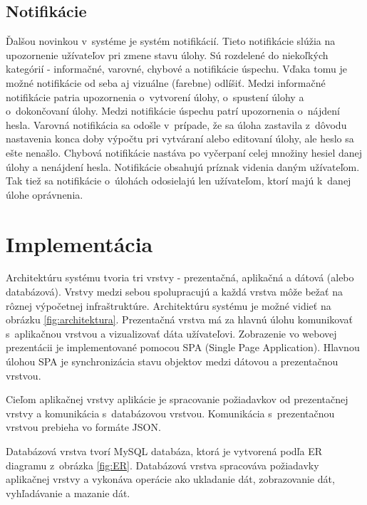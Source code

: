 \documentclass[slovak]{fitthesis}
\begin{document}
\section{Notifikácie}
Ďalšou novinkou v~systéme je systém notifikácií. Tieto notifikácie slúžia na upozornenie užívateľov pri zmene stavu úlohy. Sú rozdelené do niekoľkých kategórií - informačné, varovné, chybové a notifikácie úspechu. Vďaka tomu je možné notifikácie od seba aj vizuálne (farebne) odlíšiť. Medzi informačné notifikácie patria upozornenia o~vytvorení úlohy, o~spustení úlohy a o~dokončovaní úlohy. Medzi notifikácie úspechu patrí upozornenia o~nájdení hesla. Varovná notifikácia sa odošle v~prípade, že sa úloha zastavila z~dôvodu nastavenia konca doby výpočtu pri vytváraní alebo editovaní úlohy, ale heslo sa ešte nenašlo. Chybová notifikácie nastáva po vyčerpaní celej množiny hesiel danej úlohy a nenájdení hesla. Notifikácie obsahujú príznak videnia daným užívateľom. Tak tiež sa notifikácie o~úlohách odosielajú len užívateľom, ktorí majú k~danej úlohe oprávnenia.





\chapter{Implementácia}\label{implementacia}
Architektúru systému tvoria tri vrstvy - prezentačná, aplikačná a dátová (alebo databázová). Vrstvy medzi sebou spolupracujú a každá vrstva môže bežať na rôznej výpočetnej infraštruktúre. Architektúru systému je možné vidieť na obrázku \ref{fig:architektura}.
Prezentačná vrstva má za hlavnú úlohu komunikovať s~aplikačnou vrstvou a vizualizovať dáta užívateľovi. Zobrazenie vo webovej prezentácii je implementované pomocou SPA (Single Page Application). Hlavnou úlohou SPA je synchronizácia stavu objektov medzi dátovou a prezentačnou vrstvou. 

Cieľom aplikačnej vrstvy aplikácie je spracovanie požiadavkov od prezentačnej vrstvy a komunikácia s~databázovou vrstvou. Komunikácia s~prezentačnou vrstvou prebieha vo formáte JSON.

Databázová vrstva tvorí MySQL databáza, ktorá je vytvorená podľa ER diagramu z~obrázka \ref{fig:ER}. Databázová vrstva spracováva požiadavky aplikačnej vrstvy a vykonáva operácie ako ukladanie dát, zobrazovanie dát, vyhľadávanie a mazanie dát.
\end{document}
